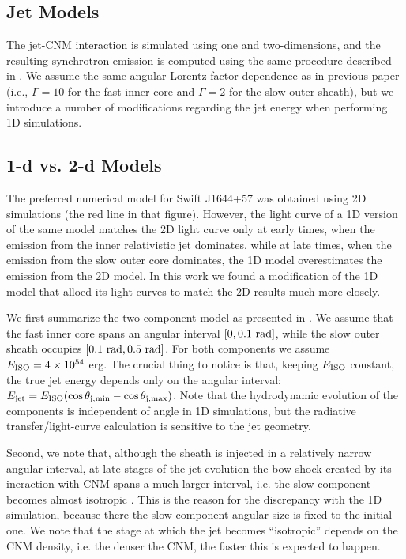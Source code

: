 \documentclass[usenatbib,fleqn]{mnras}
\begin{document}
\subsection{Jet Models}
\label{sec:numerical}

The jet-CNM interaction is simulated using one and two-dimensions, and
the resulting synchrotron emission is computed using the same
procedure described in \citet{Mimica+2015}. We assume the same angular
Lorentz factor dependence as in previous paper (i.e., $\Gamma = 10$
for the fast inner core and $\Gamma = 2$ for the slow outer sheath),
but we introduce a number of modifications regarding the jet energy
when performing 1D simulations.

\subsection{1-d vs. 2-d Models}
\label{sec:2d}

The preferred numerical model for Swift J1644+57 \citep[Fig.10
in][]{Mimica+2015} was obtained using 2D simulations (the red line in
that figure). However, the light curve of a 1D version of the same
model \citep[black line in Fig. 10 in][see also section 4.2 of that
paper]{Mimica+2015} matches the 2D light curve only at early times,
when the emission from the inner relativistic jet dominates, while at
late times, when the emission from the slow outer core dominates, the
1D model overestimates the emission from the 2D model. In this work we
found a modification of the 1D model that alloed its light curves to
match the 2D results much more closely.

We first summarize the two-component model as presented in
\citet{Mimica+2015}. We assume that the fast inner core spans an
angular interval $[0, 0.1\ {\rm rad}]$, while the slow outer sheath
occupies $[0.1\ {\rm rad}, 0.5\ {\rm rad}]$. For both components we
assume $E_{\rm ISO} = 4\times 10^{54}$ erg. The crucial thing to
notice is that, keeping $E_{\rm ISO}$ constant, the true jet energy
depends only on the angular interval: $E_{\rm jet} = E_{\rm ISO}
(\cos\theta_{\rm j,min} - \cos\theta_{\rm j,max})$. Note that the
hydrodynamic evolution of the components is independent of angle in 1D
simulations, but the radiative transfer/light-curve calculation is
sensitive to the jet geometry.

Second, we note that, although the sheath is injected in a relatively
narrow angular interval, at late stages of the jet evolution the bow
shock created by its ineraction with CNM spans a much larger interval,
i.e. the slow component becomes almost isotropic \citep[bottom two
panels in Fig. 8 in][]{Mimica+2015}. This is the reason for the
discrepancy with the 1D simulation, because there the slow component
angular size is fixed to the initial one. We note that the stage at
which the jet becomes ``isotropic'' depends on the CNM density,
i.e. the denser the CNM, the faster this is expected to happen.
\end{document}
